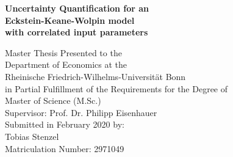 \begin{titlepage}
	
\begin{center}
	
\vspace*{1.0cm}

{\LARGE
\bfseries Uncertainty Quantification for an \\
\vspace*{0.5cm}
Eckstein-Keane-Wolpin model
}
\\
\vspace*{0.5cm}
{\LARGE
\bfseries with correlated input parameters
}

{\large
\vspace*{4.0cm}
Master Thesis Presented to the\\
\vspace*{0.25cm}
Department of Economics at the\\
\vspace*{0.25cm}
Rheinische Friedrich-Wilhelms-Universität Bonn\\

\vspace*{2.0cm}
in Partial Fulfillment of the Requirements for the Degree of\\
\vspace*{0.25cm}
Master of Science (M.Sc.)\\

\vspace*{4.0cm}
Supervisor: Prof. Dr. Philipp Eisenhauer\\

\vspace*{2.0cm}
Submitted in February 2020 by:\\
Tobias Stenzel\\
Matriculation Number: 2971049
}

\end{center}

\end{titlepage}
